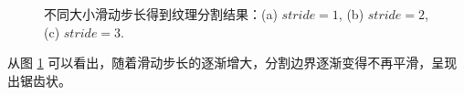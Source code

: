 \begin{figure}[!ht]
	\vspace{-0.8cm}
  \centering
  \begin{minipage}[b]{\linewidth} 	
  \end{minipage}
  \vfill
  \caption{不同大小滑动步长得到纹理分割结果：(a) $stride=1$, (b) $stride=2$, (c) $stride=3$.}
  \label{fig:stride_result}
\end{figure}

从图 \ref{fig:stride_result} 可以看出，随着滑动步长的逐渐增大，分割边界逐渐变得不再平滑，呈现出锯齿状。

